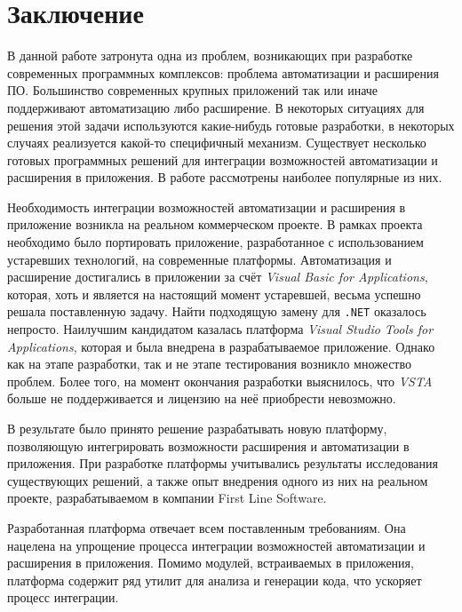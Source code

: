 



\setcounter{secnumdepth}{0}
\section{Заключение}
\setcounter{secnumdepth}{2}

В данной работе затронута одна из проблем, возникающих при разработке современных программных комплексов: проблема автоматизации и расширения ПО. Большинство современных крупных приложений так или иначе поддерживают автоматизацию либо расширение. В некоторых ситуациях для решения этой задачи используются какие-нибудь готовые разработки, в некоторых случаях реализуется какой-то специфичный механизм. Существует несколько готовых программных решений для интеграции возможностей автоматизации и расширения в приложения. В работе рассмотрены наиболее популярные из них. 

Необходимость интеграции возможностей автоматизации и расширения в приложение возникла на реальном коммерческом проекте. В рамках проекта необходимо было портировать приложение, разработанное с использованием устаревших технологий, на современные платформы. Автоматизация и расширение достигались в приложении за счёт {\it Visual Basic for Applications}, которая, хоть и является на настоящий момент устаревшей, весьма успешно решала поставленную задачу. Найти подходящую замену для {\tt .NET} оказалось непросто. Наилучшим кандидатом казалась платформа {\it Visual Studio Tools for Applications}, которая и была внедрена в разрабатываемое приложение. Однако как на этапе разработки, так и не этапе тестирования возникло множество проблем. Более того, на момент окончания разработки выяснилось, что {\it VSTA} больше не поддерживается и лицензию на неё приобрести невозможно.

В результате было принято решение разрабатывать новую платформу, позволяющую интегрировать возможности расширения и автоматизации в приложения. При разработке платформы учитывались результаты исследования существующих решений, а также опыт внедрения одного из них на реальном проекте, разрабатываемом в компании First Line Software.

Разработанная платформа отвечает всем поставленным требованиям. Она нацелена на упрощение процесса интеграции возможностей автоматизации и расширения в приложения. Помимо модулей, встраиваемых в приложения, платформа содержит ряд утилит для анализа и генерации кода, что ускоряет процесс интеграции.

\pagebreak